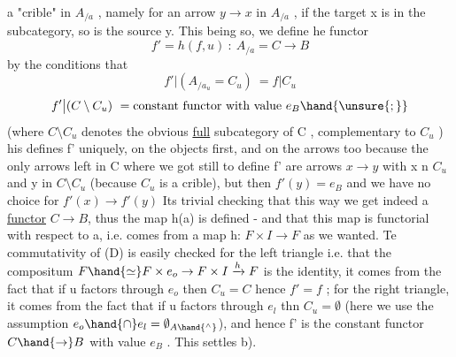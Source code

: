 
a "crible"\inserted{[or ``sieve'']} in $A_{/a}$ , namely for an arrow $y\to x$ in $A_{/a}$ , if the target x is
in the subcategory, so is the source y. This being so, we define he
functor
\[ f' = h(f,u) \ : \ A_{/a}=C \to B \]
by the conditions that
\[ f'\big|(A_{/a_u} = C_u) \ = f\big|C_u \]
\[ f'\big|(C\setminus C_u) \ = \text{constant functor with value } e_B\hand{\unsure{;}} \]
(where $C\setminus C_u$ denotes the obvious \uline{full} subcategory of C , complementary to
$C_u$ ) his defines f' uniquely,  on the objects first, and on the
arrows too because the only arrows left  in C where we got still to
define f' are arrows $x \to y$ with x n $C_u$ and y in $C\setminus C_u$ (because $C_u$ is a
crible), but then $f'(y) = e_B$ and we have no choice for $f'(x)\to f'(y)$\hand{!}
Its trivial checking that this way we get indeed a \uline{functor} $C\to B$, thus
the map h(a) is defined - and that this map is functorial with respect to
a, i.e. comes from a map h: $F\times I \to F$ as we wanted. Te commutativity
of (D) is easily checked\over{\unsure{,}}{;} for the left triangle i.e. that the compositum
$F \hand{\simeq} F\times e_o \to F\times I \xrightarrow{h} F$ is the identity, it comes from the fact that if u
factors through $e_o$ then $C_u = C$ hence $f' = f$ ; for the right triangle, it
comes from the fact that if u factors through $e_l$ thn $C_u = \emptyset$ (here we use
the assumption $e_o\hand{\cap}e_l = \emptyset_{A\hand{^\wedge}}$), and hence f' is the constant functor $C\hand{\to} B$
with value $e_B$ . This settles b).

